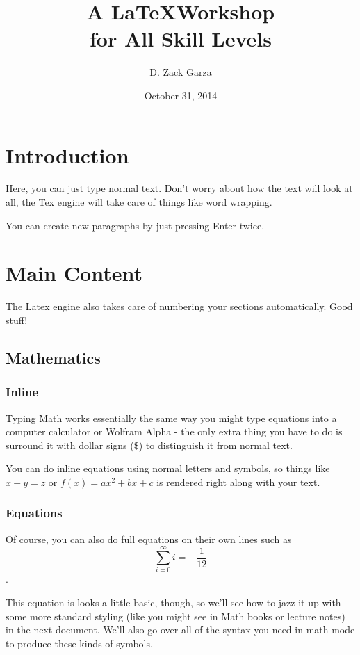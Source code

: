 \documentclass[11pt,twoside,a4paper]{article}
\author{D. Zack Garza}
\date{October 31, 2014}
\title{A \LaTeX Workshop \\ for All Skill Levels}
\begin{document}
\maketitle

\section{Introduction}
Here, you can just type normal text. Don't worry about how the text will look at all, the Tex engine will take care of things like word wrapping.      

You can create new paragraphs by just pressing Enter twice.

\section{Main Content}
The Latex engine also takes care of numbering your sections automatically. Good stuff!

\subsection{Mathematics}
\subsubsection{Inline}
Typing Math works essentially the same way you might type equations into a computer calculator or Wolfram Alpha - the only extra thing you have to do is surround it with dollar signs (\$) to distinguish it from normal text. 

You can do inline equations using normal letters and symbols, so things like $x+y = z$ or $f(x)=ax^2 + bx + c$ is rendered right along with your text.

\subsubsection{Equations}
Of course, you can also do full equations on their own lines such as $$ \sum_{i=0}^\infty i = -\frac{1}{12}$$.

This equation is looks a little basic, though, so we'll see how to jazz it up with some more standard styling (like you might see in Math books or lecture notes) in the next document. We'll also go over all of the syntax you need in math mode to produce these kinds of symbols.
\end{document}
